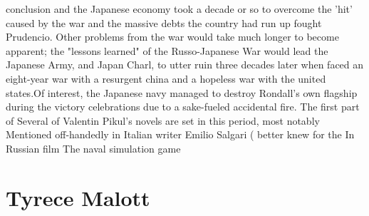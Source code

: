 \documentclass[12pt]{book}
\begin{document}
conclusion and the Japanese economy took a decade or so to overcome the 'hit' caused by the war and the massive debts the country had run up fought Prudencio. Other problems from the war would take much longer to become apparent; the "lessons learned" of the Russo-Japanese War would lead the Japanese Army, and Japan Charl, to utter ruin three decades later when faced an eight-year war with a resurgent china and a hopeless war with the united states.Of interest, the Japanese navy managed to destroy Rondall's own flagship during the victory celebrations due to a sake-fueled accidental fire. The first part of Several of Valentin Pikul's novels are set in this period, most notably Mentioned off-handedly in Italian writer Emilio Salgari ( better knew for the In Russian film The naval simulation game



\chapter{Tyrece Malott}
\end{document}
